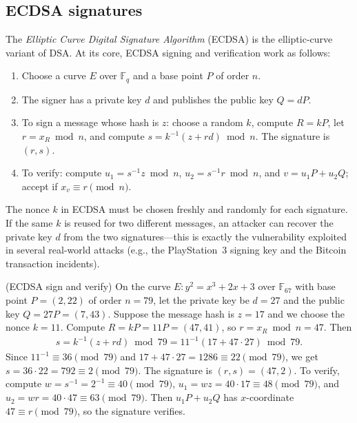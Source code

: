 \documentclass[a4paper, 12pt]{book} %
\begin{document}
\subsection{ECDSA signatures}

The \emph{Elliptic Curve Digital Signature Algorithm} (ECDSA) is the elliptic-curve
variant of DSA. At its core, ECDSA signing and verification work as follows:
\begin{enumerate}
    \item Choose a curve $E$ over $\mathbb{F}_q$ and a base point $P$ of order $n$.
    \item The signer has a private key $d$ and publishes the public key $Q = dP$.
    \item To sign a message whose hash is $z$: choose a random $k$, compute $R = kP$, let $r = x_R \bmod n$, and compute $s = k^{-1}(z + rd) \bmod n$. The signature is $(r, s)$.
    \item To verify: compute $u_1 = s^{-1}z \bmod n$, $u_2 = s^{-1}r \bmod n$, and $v = u_1 P + u_2 Q$; accept if $x_v \equiv r \pmod n$.
\end{enumerate}

\begin{remark}
    The nonce $k$ in ECDSA must be chosen freshly and randomly for each signature. If the same $k$ is reused for two different messages, an attacker can recover the private key $d$ from the two signatures---this is exactly the vulnerability exploited in several real-world attacks (e.g., the PlayStation~3 signing key and the Bitcoin transaction incidents).
\end{remark}

\begin{example}
    (ECDSA sign and verify) On the curve $E: y^2 = x^3 + 2x + 3$ over $\mathbb{F}_{67}$ with base point $P = (2, 22)$ of order $n = 79$, let the private key be $d = 27$ and the public key $Q = 27P = (7, 43)$. Suppose the message hash is $z = 17$ and we choose the nonce $k = 11$. Compute $R = kP = 11P = (47, 41)$, so $r = x_R \bmod n = 47$. Then
    \begin{align}
        s = k^{-1}(z + rd) \bmod 79 = 11^{-1}(17 + 47 \cdot 27) \bmod 79.
    \end{align}
    Since $11^{-1} \equiv 36 \pmod{79}$ and $17 + 47\cdot 27 = 1286 \equiv 22 \pmod{79}$, we get $s = 36 \cdot 22 = 792 \equiv 2 \pmod{79}$. The signature is $(r, s) = (47, 2)$. To verify, compute $w = s^{-1} = 2^{-1} \equiv 40 \pmod{79}$, $u_1 = wz = 40 \cdot 17 \equiv 48 \pmod{79}$, and $u_2 = wr = 40 \cdot 47 \equiv 63 \pmod{79}$. Then $u_1P + u_2Q$ has $x$-coordinate $47 \equiv r \pmod{79}$, so the signature verifies.
\end{example}
\end{document}
